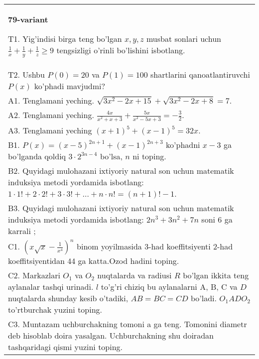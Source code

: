 \documentclass{article}
\begin{document}
\begin{tabular}{m{17cm}}
\textbf{79-variant}
\newline

T1. Yig'indisi birga teng bo'lgan \(x,y,z\) musbat sonlari uchun \(\frac{1}{x} + \frac{1}{y} + \frac{1}{z} \geq 9\) tengsizligi o'rinli bo'lishini isbotlang. \\
T2. Ushbu \(P(0) = 20\) va \(P(1) = 100\) shartlarini qanoatlantiruvchi \(P(x)\) ko'phadi mavjudmi? \\
A1. Tenglamani yeching. \(\sqrt{3x^{2} - 2x + 15} + \sqrt{3x^{2} - 2x + 8} = 7\). \\
A2. Tenglamani yeching. \(\frac{4x}{x^{2} + x + 3} + \frac{5x}{x^{2} - 5x + 3} = - \frac{3}{2}\). \\
A3. Tenglamani yeching \((x + 1)^{5} + (x - 1)^{5} = 32x\). \\
B1. \(P(x) = (x - 5)^{2n + 1} + (x - 1)^{2n + 3}\) ko'phadni \(x - 3\) ga bo'lganda qoldiq \(3 \cdot 2^{3n - 4}\) bo'lsa, \(n\) ni toping. \\
B2. Quyidagi mulohazani ixtiyoriy natural son uchun matematik induksiya metodi yordamida isbotlang: \(1 \cdot 1! + 2 \cdot 2! + 3 \cdot 3! + \ldots + n \cdot n! = (n + 1)! - 1\). \\
B3. Quyidagi mulohazani ixtiyoriy natural son uchun matematik induksiya metodi yordamida isbotlang: \(2n^{3} + 3n^{2} + 7n\) soni 6 ga karrali ; \\
C1. \(\left( x\sqrt{x} - \frac{1}{x^{4}} \right)^{n}\) binom yoyilmasida 3-had koeffitsiyenti 2-had koeffitsiyentidan 44 ga katta.Ozod hadini toping. \\
C2. Markazlari \(O_{1}\) va \(O_{2}\) nuqtalarda va radiusi \(R\) bo'lgan ikkita teng aylanalar tashqi urinadi. \(l\) to'g'ri chiziq bu aylanalarni A, B, C va \(D\) nuqtalarda shunday kesib o'tadiki, \(AB = BC = CD\) bo'ladi. \(O_{1}ADO_{2}\) to'rtburchak yuzini toping. \\
C3. Muntazam uchburchakning tomoni a ga teng. Tomonini diametr deb hisoblab doira yasalgan. Uchburchakning shu doiradan tashqaridagi qismi yuzini toping. \\

\end{tabular}
\vspace{1cm}
\end{document}
